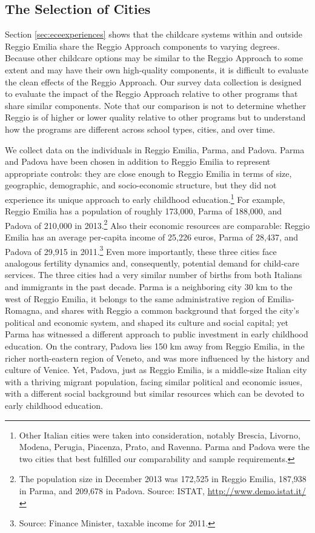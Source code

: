 \subsection{The Selection of Cities}
Section \ref{sec:eceexperiences} shows that the childcare systems within and outside Reggio Emilia share the Reggio Approach components to varying degrees. Because other childcare options may be similar to the Reggio Approach to some extent and may have their own high-quality components, it is difficult to evaluate the clean effects of the Reggio Approach. Our survey data collection is designed to evaluate the impact of the Reggio Approach relative to other programs that share similar components. Note that our comparison is not to determine whether Reggio is of higher or lower quality relative to other programs but to understand how the programs are different across school types, cities, and over time. 

We collect data on the individuals in Reggio Emilia, Parma, and Padova. Parma and Padova
have been chosen in addition to Reggio Emilia to represent appropriate controls: they are close enough to
Reggio Emilia in terms of size, geographic, demographic, and socio-economic
structure, but they did not experience its unique approach to early
childhood education.\footnote{%
Other Italian cities were taken into consideration, notably Brescia,
Livorno, Modena, Perugia, Piacenza, Prato, and Ravenna. Parma and Padova
were the two cities that best fulfilled our comparability and sample
requirements.} For example, Reggio Emilia has a population of roughly
173,000, Parma of 188,000, and Padova of 210,000 in 2013.\footnote{%
The population size in December 2013 was 172,525 in Reggio Emilia, 187,938
in Parma, and 209,678 in Padova. Source: ISTAT, %
\url{http://www.demo.istat.it/}} Also their economic resources are
comparable: Reggio Emilia has an average per-capita income of 25,226 euros,
Parma of 28,437, and Padova of 29,915 in 2011.\footnote{%
Source: Finance Minister, taxable income for 2011.} 
Even more importantly, these three cities face analogous fertility dynamics
and, consequently, potential demand for child-care services. The three
cities had a very similar number of births from both Italians and immigrants
in the past decade. Parma is a neighboring city 30 km to the west of Reggio
Emilia, it belongs to the same administrative region of Emilia-Romagna, and
shares with Reggio a common background that forged the city's political and
economic system, and shaped its culture and social capital; yet Parma has
witnessed a different approach to public investment in early childhood
education. On the contrary, Padova lies 150 km away from Reggio Emilia, in
the richer north-eastern region of Veneto, and was more influenced by the
history and culture of Venice. Yet, Padova, just as Reggio Emilia, is a middle-size
Italian city with a thriving migrant population, facing similar political
and economic issues, with a different social background but similar
resources which can be devoted to early childhood education.


